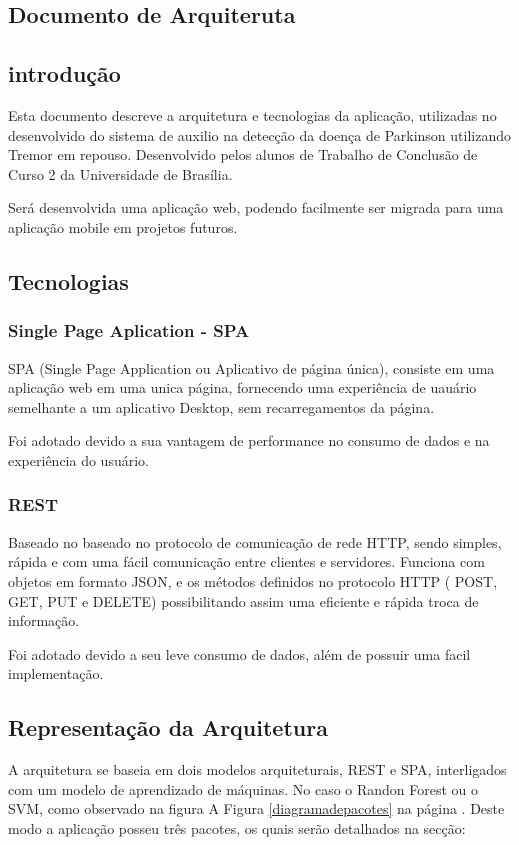 \begin{anexosenv}

	\partanexos
	\chapter{Documento de Arquiteruta}
	\label{adoarquitetura}
	\section{introdução}
	Esta documento descreve a arquitetura e tecnologias da aplicação, utilizadas no desenvolvido do sistema de auxilio na detecção da doença de Parkinson utilizando Tremor em repouso. Desenvolvido pelos alunos de Trabalho de Conclusão de Curso 2 da Universidade de Brasília.

	Será desenvolvida uma aplicação web, podendo facilmente ser migrada para uma aplicação mobile em projetos futuros.

	\section{Tecnologias}
	\subsection{Single Page Aplication - SPA}
	SPA (Single Page Application ou Aplicativo de página única), consiste em uma aplicação web em uma unica página, fornecendo uma experiência de uauário semelhante a um aplicativo Desktop, sem recarregamentos da página.

    Foi adotado devido a sua vantagem de performance no consumo de dados e na experiência do usuário.

	\subsection{REST}
	Baseado no baseado no protocolo de comunicação de rede HTTP, sendo simples, rápida e com uma fácil comunicação entre clientes e servidores. Funciona com objetos em formato JSON, e os métodos definidos no protocolo HTTP ( POST, GET, PUT e DELETE) possibilitando assim uma eficiente e rápida troca de informação.

    Foi adotado devido a seu leve consumo de dados, além de possuir uma facil implementação. 

	\section{Representação da Arquitetura}
	A arquitetura se baseia em dois modelos arquiteturais, REST e SPA, interligados com um modelo de aprendizado de máquinas. No caso o Randon Forest ou o SVM, como observado na figura A Figura \ref{diagramadepacotes} na página \pageref{diagramadepacotes}. Deste modo a aplicação posseu três pacotes, os quais serão detalhados na secção:


\end{anexosenv}
